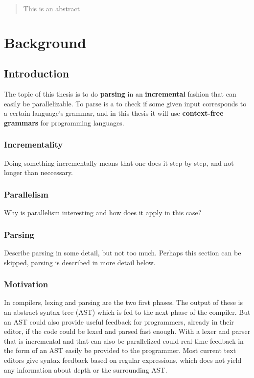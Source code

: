 \documentclass[a4paper,12pt,twosided]{report}
\begin{document}


\begin{abstract}
This is an abstract
\end{abstract}

\tableofcontents

%
%

\chapter{Background}

\section{Introduction}
The topic of this thesis is to do \textbf{parsing} in an \textbf{incremental}
fashion that can easily be parallelizable. To parse is a to check if some given
input corresponds to a certain language's grammar, and in this thesis it will
use \textbf{context-free grammars} for programming languages.

\subsection{Incrementality}
Doing something incrementally means that one does it step by step, and not
longer than neccessary.

\subsection{Parallelism}
Why is parallelism interesting and how does it apply in this case?

\subsection{Parsing}
Describe parsing in some detail, but not too much. Perhaps this section can be
skipped, parsing is described in more detail below.

\subsection{Motivation}
In compilers, lexing and parsing are the two first phases. The output of these
is an abstract syntax tree (AST) which is fed to the next phase of the compiler.
But an AST could also provide useful feedback for programmers, already in their
editor, if the code could be lexed and parsed fast enough. With a lexer and
parser that is incremental and that can also be parallelized could real-time
feedback in the form of an AST easily be provided to the programmer. Most
current text editors give syntax feedback based on regular expressions, which
does not yield any information about depth or the surrounding AST.
\end{document}
